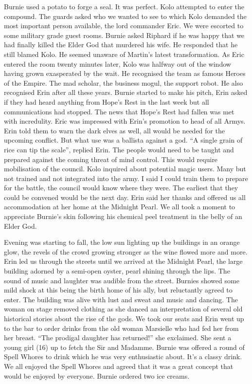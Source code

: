 Burnie used a potato to forge a seal. It was perfect. Kolo attempted to enter the compound. The guards asked who we wanted to see to which Kolo demanded the most important person available, the lord commander Eric. We were escorted to some military grade guest rooms. Burnie asked Riphard if he was happy that we had finally killed the Elder God that murdered his wife. He responded that he still blamed Kolo. He seemed unaware of Martin’s latest transformation. As Eric entered the room twenty minutes later, Kolo was halfway out of the window having grown exasperated by the wait. He recognised the team as famous Heroes of the Empire. The mad scholar, the business mogul, the support robot. He also recognised Erin after all these years. Burnie started to make his pitch, Erin asked if they had heard anything from Hope’s Rest in the last week but all communications had stopped. The news that Hope’s Rest had fallen was met with incredulity. Eric was impressed with Erin’s promotion to head of all Armys. Erin told them to warn the dark elves as well, all would be needed for the upcoming conflict. But what use was a ballista against a god. “A single grain of rice can tip the scale”, replied Erin. The people would need to be taught and prepared against the coming threat of mind control. This would require mobilisation of the council. Kolo inquired about potential magic users. Many but not trained and not integrated into the army. I said I could train them to prepare for the battle, the council would know where they were. The earliest that they could be convened would be the next day. Erin said her thanks and offered us all accommodation at her home at the Midnight Pearl. We all took a moment to appreciate Burnie’s skin following his chemical peel treatment in the belly of an Elder God.\medskip

Evening was starting to fall, the low sun lighting up the buildings in an orange glow, the revels of the crowd growing stronger as the wine flowed more and more. Erin led us through the streets until we arrived at the Midnight Pearl, the large building adorned by a semi-open oyster, pearl shining through the lips. The sound of music and laughter was audible from the street. Burnies showed some mild shock at this being the birth home of his ally, but reluctantly agreed to enter. The building was alive with lust and sweat and music and dancing. The woman on stage removed clothing as she danced an interpretation of several old historical stories about the rise of the gods. We took our seats and Erin went up to the bar to order drinks from the old woman Marsielle who had fed her from her breast. “The prodigal daughter has returned!” she exclaimed. She sent a young girl (16) up to fetch the Sir and Madamme. Burnie was offered a round of Spell Whores to drink which he was very enthusiastic about. It’s a classy drink. We all enjoyed the Spell Whores and agreed that it was a great concept that would be enjoyed by everyone. Burnie ordered two ice creams.\medskip

